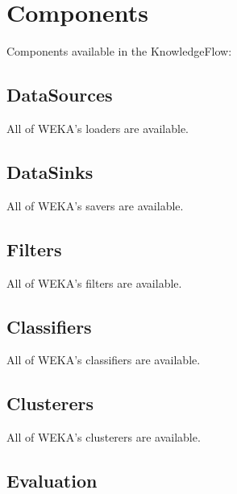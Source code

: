 \newpage
\section{Components}
Components available in the KnowledgeFlow:

\subsection{DataSources} All of WEKA's loaders are available.
\begin{center}
\end{center}

\subsection{DataSinks} All of WEKA's savers are available.
\begin{center}
\end{center}

\subsection{Filters} All of WEKA's filters are available.
\begin{center}
\end{center}

\subsection{Classifiers} All of WEKA's classifiers are available.
\begin{center}
\end{center}

\subsection{Clusterers} All of WEKA's clusterers are available.
\begin{center}
\end{center}

\subsection{Evaluation}
\begin{center}
\end{center}

